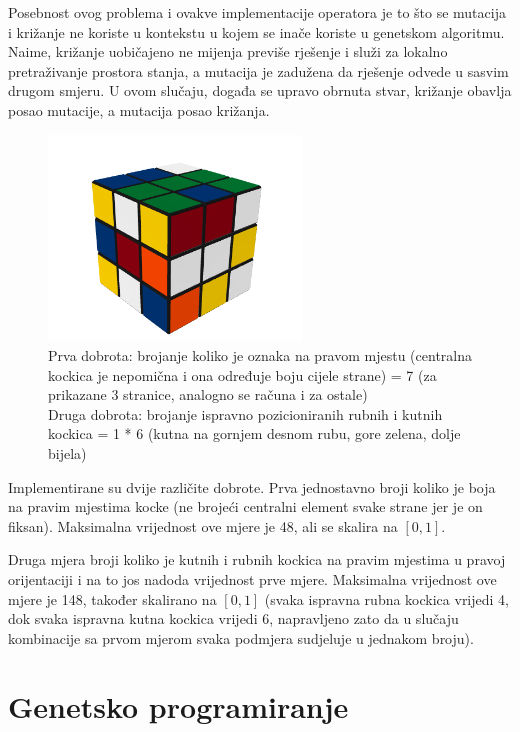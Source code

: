 \documentclass[times, utf8, seminar, numeric]{fer}
\begin{document}
Posebnost ovog problema i ovakve implementacije operatora je to što se mutacija i križanje ne koriste u kontekstu u kojem se inače koriste u genetskom algoritmu. Naime, križanje uobičajeno ne mijenja previše rješenje i služi za lokalno pretraživanje prostora stanja, a mutacija je zadužena da rješenje odvede u sasvim drugom smjeru. U ovom slučaju, događa se upravo obrnuta stvar, križanje obavlja posao mutacije, a mutacija posao križanja.

\begin{figure}[h!]
\centering
\includegraphics[width=0.6\textwidth]{image/rubik_cube_scrambled.png}
\caption{Prva dobrota: brojanje koliko je oznaka na pravom mjestu (centralna kockica je nepomična i ona određuje boju cijele strane) = 7 (za prikazane 3 stranice, analogno se računa i za ostale)\\
Druga dobrota: brojanje ispravno pozicioniranih rubnih i kutnih kockica = 1 * 6 (kutna na gornjem desnom rubu, gore zelena, dolje bijela)}

\end{figure}

Implementirane su dvije različite dobrote. 
Prva jednostavno broji koliko je boja na pravim mjestima kocke (ne brojeći centralni element svake strane jer je on fiksan). Maksimalna vrijednost ove mjere je 48, ali se skalira na $[0, 1]$.

Druga mjera broji koliko je kutnih i rubnih kockica na pravim mjestima u pravoj orijentaciji i na to jos nadoda vrijednost prve mjere. Maksimalna vrijednost ove mjere je 148, također skalirano na $[0, 1]$ (svaka ispravna rubna kockica vrijedi 4, dok svaka ispravna kutna kockica vrijedi 6, napravljeno zato da u slučaju kombinacije sa prvom mjerom svaka podmjera sudjeluje u jednakom broju).


\chapter{Genetsko programiranje}
\end{document}
